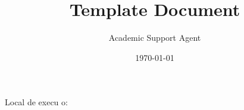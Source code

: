 \documentclass{article}
\title{Template Document}
\author{Academic Support Agent}
\date{\today}
\begin{document}
\maketitle

\pagestyle{meuestilo}
\checkandfixthelayout

\frenchspacing 


%
%








\textual
\pagestyle{meuestilo}

\phantom{This text will be invisible}
\vfill

\begin{center}
\imprimirtitulo
\end{center}

\vfill

\begin{center}
Local de execu o: \imprimirlocal
\end{center}

\vfill

\begin{center}
\imprimirdata
\end{center}
\newpage
\end{document}
